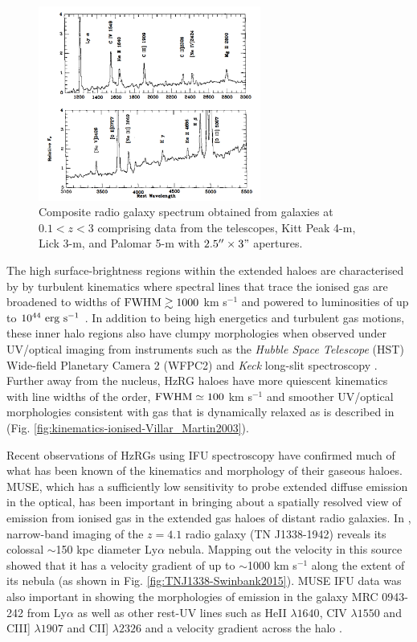 \documentclass[10pt,a4paper]{article}
\begin{document}
\begin{figure}
\centering
  \includegraphics[width=0.65\textwidth]{plots_chp1/UV_spectrum_McCarthy2003}
  \caption[Composite radio galaxy spectrum from galaxies at $0.1 < z < 3$]{Composite radio galaxy spectrum obtained from galaxies at $0.1 < z < 3$ comprising data from the telescopes, Kitt Peak 4-m, Lick 3-m, and Palomar 5-m with $2.5'' \times 3"$ apertures. }
  \label{fig:comp_spec_RGs}
\end{figure}

The high surface-brightness regions within the extended haloes are characterised by by turbulent kinematics where spectral lines that trace the ionised gas are broadened to widths of $\rm FWHM \gtrsim 1000$ km s$^{-1}$ and powered to luminosities of up to $\rm 10^{44}~erg~s^{-1}$ \citep{mccarthy1996,villar-martin1999a}. In addition to being high energetics and turbulent gas motions, these inner halo regions also have clumpy morphologies when observed under UV/optical imaging from instruments such as the {\it Hubble Space Telescope} (HST) Wide-field Planetary Camera 2 (WFPC2) and {\it Keck} long-slit spectroscopy \citep{humphrey2006,Villar-Martin2006}. Further away from the nucleus, HzRG haloes have more quiescent kinematics with line widths of the order, $\rm FWHM \simeq 100$ km s$^{-1}$ and smoother UV/optical morphologies consistent with gas that is dynamically relaxed as is described in \citet{villar-martin2003} (Fig. \ref{fig:kinematics-ionised-Villar_Martin2003}). 

Recent observations of HzRGs using IFU spectroscopy have confirmed much of what has been known of the kinematics and morphology of their gaseous haloes. MUSE, which has a sufficiently low sensitivity to probe extended diffuse emission in the optical, has been important in bringing about a spatially resolved view of emission from ionised gas in the extended gas haloes of distant radio galaxies. In \citet{swinbank2015}, narrow-band imaging of the $z=4.1$ radio galaxy (TN J1338-1942) reveals its colossal $\sim$150 kpc diameter Ly$\alpha$ nebula. Mapping out the velocity in this source showed that it has a velocity gradient of up to $\sim$1000 km s$^{-1}$ along the extent of its nebula (as shown in Fig. \ref{fig:TNJ1338-Swinbank2015}). MUSE IFU data was also important in showing the morphologies of emission in the galaxy MRC 0943-242 from Ly$\alpha$ as well as other rest-UV lines such as HeII $\lambda1640$, CIV $\lambda1550$ and CIII] $\lambda1907$ and CII] $\lambda2326$ and a velocity gradient across the halo \citep{Gullberg2016a,Silva2018}. 
\end{document}

